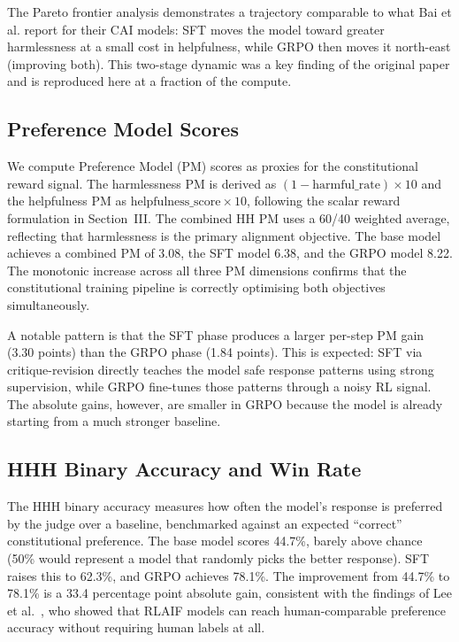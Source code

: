 \documentclass[conference]{IEEEtran}
\begin{document}
The Pareto frontier analysis demonstrates a trajectory comparable to what Bai et al. report for their CAI models: SFT moves the model toward greater harmlessness at a small cost in helpfulness, while GRPO then moves it north-east (improving both). This two-stage dynamic was a key finding of the original paper and is reproduced here at a fraction of the compute.

\subsection{Preference Model Scores}

We compute Preference Model (PM) scores as proxies for the constitutional reward signal. The harmlessness PM is derived as $(1 - \text{harmful\_rate}) \times 10$ and the helpfulness PM as $\text{helpfulness\_score} \times 10$, following the scalar reward formulation in Section~III. The combined HH PM uses a 60/40 weighted average, reflecting that harmlessness is the primary alignment objective. The base model achieves a combined PM of 3.08, the SFT model 6.38, and the GRPO model 8.22. The monotonic increase across all three PM dimensions confirms that the constitutional training pipeline is correctly optimising both objectives simultaneously.

A notable pattern is that the SFT phase produces a larger per-step PM gain (3.30 points) than the GRPO phase (1.84 points). This is expected: SFT via critique-revision directly teaches the model safe response patterns using strong supervision, while GRPO fine-tunes those patterns through a noisy RL signal. The absolute gains, however, are smaller in GRPO because the model is already starting from a much stronger baseline.

\subsection{HHH Binary Accuracy and Win Rate}

The HHH binary accuracy measures how often the model's response is preferred by the judge over a baseline, benchmarked against an expected ``correct'' constitutional preference. The base model scores 44.7\%, barely above chance (50\% would represent a model that randomly picks the better response). SFT raises this to 62.3\%, and GRPO achieves 78.1\%. The improvement from 44.7\% to 78.1\% is a 33.4 percentage point absolute gain, consistent with the findings of Lee et al.~\cite{lee2023rlaif}, who showed that RLAIF models can reach human-comparable preference accuracy without requiring human labels at all.
\end{document}
